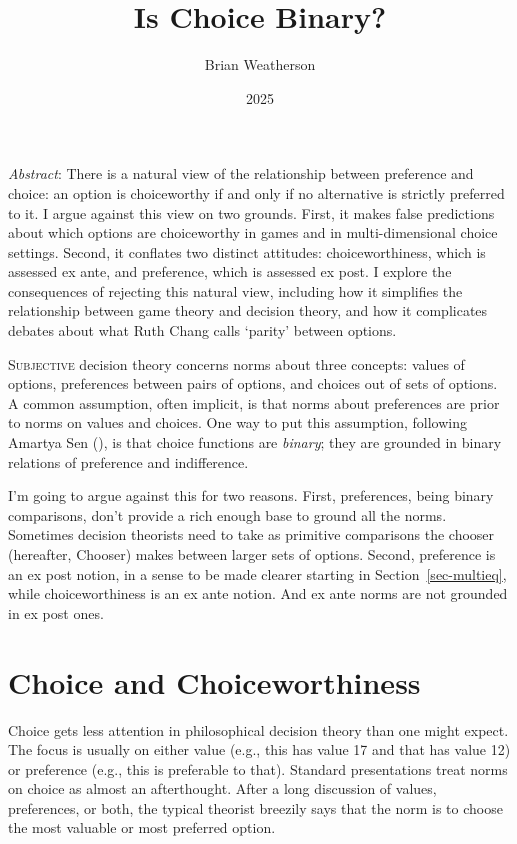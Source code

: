 \documentclass[
  11pt,
  letterpaper,
  DIV=11,
  numbers=noendperiod,
  twoside]{scrartcl}
\title{Is Choice Binary?}
\author{Brian Weatherson}
\date{2025}
\renewenvironment{abstract}
 {\vspace{-1.25cm}
 \quotation\small\noindent\emph{Abstract}:}
 {\endquotation}
\renewenvironment{abstract}
 {\quotation\small\noindent\emph{Abstract}:}
 {\endquotation\vspace{-0.02cm}}
\begin{document}
\maketitle
\begin{abstract}
There is a natural view of the relationship between preference and
choice: an option is choiceworthy if and only if no alternative is
strictly preferred to it. I argue against this view on two grounds.
First, it makes false predictions about which options are choiceworthy
in games and in multi-dimensional choice settings. Second, it conflates
two distinct attitudes: choiceworthiness, which is assessed ex ante, and
preference, which is assessed ex post. I explore the consequences of
rejecting this natural view, including how it simplifies the
relationship between game theory and decision theory, and how it
complicates debates about what Ruth Chang calls `parity' between
options.
\end{abstract}


\lettrine{S}{ubjective} decision theory concerns norms about three
concepts: values of options, preferences between pairs of options, and
choices out of sets of options. A common assumption, often implicit, is
that norms about preferences are prior to norms on values and choices.
One way to put this assumption, following Amartya Sen
(), is that choice functions
are \emph{binary}; they are grounded in binary relations of preference
and indifference.

I'm going to argue against this for two reasons. First, preferences,
being binary comparisons, don't provide a rich enough base to ground all
the norms. Sometimes decision theorists need to take as primitive
comparisons the chooser (hereafter, Chooser) makes between larger sets
of options. Second, preference is an ex post notion, in a sense to be
made clearer starting in Section~\ref{sec-multieq}, while
choiceworthiness is an ex ante notion. And ex ante norms are not
grounded in ex post ones.

\section{Choice and Choiceworthiness}\label{sec-choice}

Choice gets less attention in philosophical decision theory than one
might expect. The focus is usually on either value (e.g., this has value
17 and that has value 12) or preference (e.g., this is preferable to
that). Standard presentations treat norms on choice as almost an
afterthought. After a long discussion of values, preferences, or both,
the typical theorist breezily says that the norm is to choose the most
valuable or most preferred option.
\end{document}

